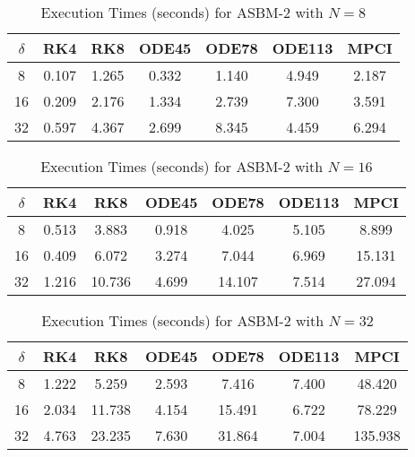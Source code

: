 \begin{table}[htbp]
\centering
\begin{tabular}{|c|c|c|c|c|c|c|}
\hline
$\delta$ & RK4 & RK8 & ODE45 & ODE78 & ODE113 & MPCI \\
\hline
8 & 0.107 & 1.265 & 0.332 & 1.140 & 4.949 & 2.187 \\
\hline
16 & 0.209 & 2.176 & 1.334 & 2.739 & 7.300 & 3.591 \\
\hline
32 & 0.597 & 4.367 & 2.699 & 8.345 & 4.459 & 6.294 \\
\hline
\end{tabular}
\caption{Execution Times (seconds) for ASBM-2 with $N=8$}
\label{tab:asbm_2_N8}
\end{table}

\begin{table}[htbp]
\centering
\begin{tabular}{|c|c|c|c|c|c|c|}
\hline
$\delta$ & RK4 & RK8 & ODE45 & ODE78 & ODE113 & MPCI \\
\hline
8 & 0.513 & 3.883 & 0.918 & 4.025 & 5.105 & 8.899 \\
\hline
16 & 0.409 & 6.072 & 3.274 & 7.044 & 6.969 & 15.131 \\
\hline
32 & 1.216 & 10.736 & 4.699 & 14.107 & 7.514 & 27.094 \\
\hline
\end{tabular}
\caption{Execution Times (seconds) for ASBM-2 with $N=16$}
\label{tab:asbm_2_N16}
\end{table}

\begin{table}[htbp]
\centering
\begin{tabular}{|c|c|c|c|c|c|c|}
\hline
$\delta$ & RK4 & RK8 & ODE45 & ODE78 & ODE113 & MPCI \\
\hline
8 & 1.222 & 5.259 & 2.593 & 7.416 & 7.400 & 48.420 \\
\hline
16 & 2.034 & 11.738 & 4.154 & 15.491 & 6.722 & 78.229 \\
\hline
32 & 4.763 & 23.235 & 7.630 & 31.864 & 7.004 & 135.938 \\
\hline
\end{tabular}
\caption{Execution Times (seconds) for ASBM-2 with $N=32$}
\label{tab:asbm_2_N32}
\end{table}
